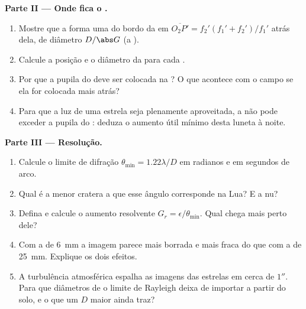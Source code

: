 \begin{problem}
\medskip
\noindent\textbf{Parte II --- Onde fica o .}
\begin{enumerate}[resume]
  \item Mostre que a  forma uma  do bordo da 
        em $\overline{O_2P'} = f_2'(f_1' + f_2')/f_1'$ atrás dela, de
        diâmetro $D/\abs G$ (a ).
  \item Calcule a posição e o diâmetro da  para cada
        .
  \item Por que a pupila do  deve ser colocada na ? O que
        acontece com o campo se ela for colocada mais atrás?
  \item Para que a luz de uma estrela seja plenamente aproveitada, a  não pode
        exceder a pupila do : deduza o aumento útil mínimo
        desta luneta à noite.
\end{enumerate}

\medskip
\noindent\textbf{Parte III --- Resolução.}
\begin{enumerate}[resume]
  \item Calcule o limite de difração $\theta_{\min} = 1.22\lambda/D$
        em radianos e em segundos de arco.
  \item Qual é a menor cratera a que esse ângulo corresponde na
        Lua? E a  nu?
  \item Defina e calcule o aumento resolvente $G_r =
        \epsilon/\theta_{\min}$. Qual  chega mais perto dele?
  \item Com a  de \qty{6}{mm} a imagem parece mais borrada e mais
        fraca do que com a de \qty{25}{mm}. Explique os dois efeitos.
  \item A turbulência atmosférica espalha as imagens das estrelas em cerca de $1''$. Para
        que diâmetros de  o limite de Rayleigh deixa de
        importar a partir do solo, e o que um $D$ maior ainda traz?
\end{enumerate}


\end{problem}
